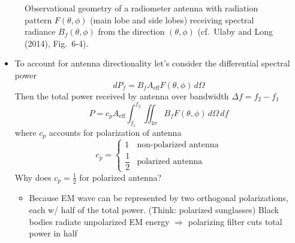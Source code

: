 \documentclass[11pt, oneside]{article}
\newcommand{\Aeff}{A_\mathrm{eff}}
\begin{document}
\begin{figure}[!htbp]
	\caption{Observational geometry of a radiometer antenna with radiation pattern $F(\theta,\phi)$ (main lobe and side lobes) receiving spectral radiance $B_f(\theta,\phi)$ from the direction $(\theta,\phi)$ (cf.\ Ulaby and Long (2014), Fig.~6-4).}
	\label{f:antenna}
\end{figure}

\begin{itemize}
	\item To account for antenna directionality let's consider the differential spectral power
	\begin{equation}
		\label{e:dPf}
		dP_f = B_f\Aeff F(\theta,\phi)\,d\Omega
	\end{equation}
	Then the total power received by antenna over bandwidth $\Delta f = f_2 - f_1$
	\begin{equation}
		\label{e:P}
		P = c_p\Aeff\int_{f_1}^{f_2}\iint_{4\pi} B_f F(\theta,\phi)\,d\Omega\,df
	\end{equation}
	where $c_p$ accounts for polarization of antenna
	\begin{equation*}
		c_p = \begin{cases} 1 & \text{non-polarized antenna}\\[2pt] \dfrac{1}{2} & \text{polarized antenna} \end{cases}
	\end{equation*}
	Why does $c_p = \frac{1}{2}$ for polarized antenna?
	\begin{itemize}
		\item[] Because EM wave can be represented by two orthogonal polarizations, each w/ half of the total power. (Think: polarized sunglasses) Black bodies radiate unpolarized EM energy $\Rightarrow$ polarizing filter cuts total power in half
	\end{itemize}
\end{itemize}
\end{document}
